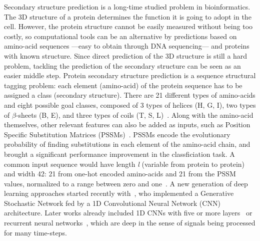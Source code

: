 \documentclass{article}
\begin{document}
Secondary structure prediction is a long-time studied problem in bioinformatics.
The 3D structure of a protein determines the function it is going to adopt in the cell.
However, the protein structure cannot be easily measured without being too costly, so computational tools can be an alternative by predictions based on amino-acid sequences ---easy to obtain through DNA sequencing--- and proteins with known structure.
Since direct prediction of the 3D structure is still a hard problem, tackling the prediction of the secondary structure can be seen as an easier middle step.
Protein secondary structure prediction is a sequence structural tagging problem: each element (amino-acid) of the protein sequence has to be assigned a class (secondary structure).
There are 21 different types of amino-acids and eight possible goal classes, composed of 3 types of helices (H, G, I), two types of $\beta$-sheets (B, E), and three types of coils (T, S, L)~\cite{Kabsch1983}.
Along with the amino-acid themselves, other relevant features can also be added as inputs, such as Position Specific Substitution Matrices (PSSMs)~\cite{Yang2018}.
PSSMs encode the evolutionary probability of finding substitutions in each element of the amino-acid chain, and brought a significant performance improvement in the classficiation task.
A common input sequence would have length \textit{l} (variable from protein to protein) and width 42: 21 from one-hot encoded amino-acids and 21 from the PSSM values, normalized to a range between zero and one~\cite{Busia2017}.
A new generation of deep learning approaches started recently with~\cite{Zhou2014}, who implemented a Generative Stochastic Network fed by a 1D Convolutional Neural Network (CNN) architecture.
Later works already included 1D CNNs with five or more layers~\cite{Fang2017,Zhou2018} or recurrent neural networks~\cite{Li2016,Wang2016,Jurtz2017,Zhou2018,Wang2017}, which are deep in the sense of signals being processed for many time-steps.
\end{document}
